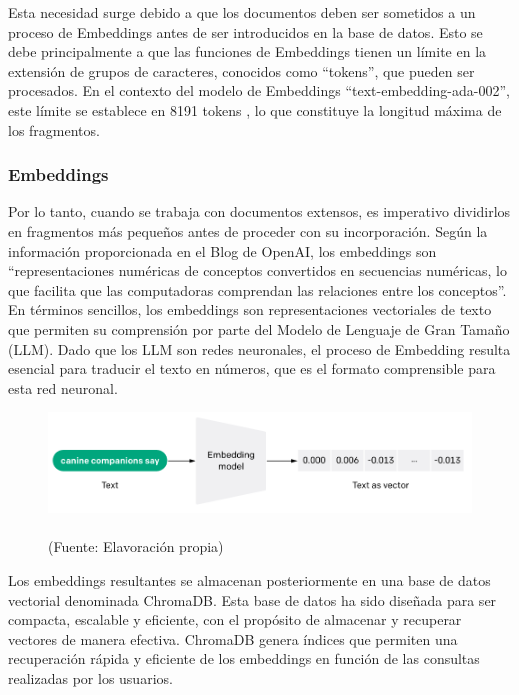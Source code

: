 \par Esta necesidad surge debido a que los documentos deben ser sometidos a un proceso de Embeddings antes de ser 
introducidos en la base de datos. Esto se debe principalmente a que las funciones de Embeddings tienen un límite en la extensión 
de grupos de caracteres, conocidos como ``tokens'', que pueden ser procesados. En el contexto del modelo de Embeddings 
``text-embedding-ada-002'', este límite se establece en 8191 tokens \cite{openai1}, lo que constituye la longitud máxima de los fragmentos.

\subsubsection{Embeddings}



\par Por lo tanto, cuando se trabaja con documentos extensos, es imperativo dividirlos en fragmentos más pequeños antes de proceder 
con su incorporación. Según la información proporcionada en el Blog de OpenAI, los embeddings son ``representaciones numéricas 
de conceptos convertidos en secuencias numéricas, lo que facilita que las computadoras comprendan las relaciones entre los 
conceptos''\cite{openai1}. En términos sencillos, los embeddings son representaciones vectoriales de texto que permiten su comprensión por 
parte del Modelo de Lenguaje de Gran Tamaño (LLM). Dado que los LLM son redes neuronales, el proceso de Embedding resulta 
esencial para traducir el texto en números, que es el formato comprensible para esta red neuronal.

\begin{figure}[ht!]
    \centering
    \includegraphics[width=.5\textwidth]{figures/huemul4.png}
    \caption[]{\\
    {\scriptsize (Fuente: Elavoración propia)}}
    \label{fig:chatbot1}
\end{figure}

\par Los embeddings resultantes se almacenan posteriormente en una base de datos vectorial denominada ChromaDB. Esta base de 
datos ha sido diseñada para ser compacta, escalable y eficiente, con el propósito de almacenar y recuperar vectores de manera 
efectiva. ChromaDB genera índices que permiten una recuperación rápida y eficiente de los embeddings en función de las 
consultas realizadas por los usuarios\cite{langchain1}.


